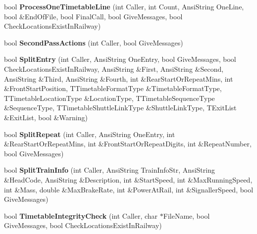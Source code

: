 \begin{DoxyCompactItemize}
\item 
\mbox{\label{class_t_train_controller_a5c51eb1e0018e189966ffdbc5d251990}} 
bool {\bfseries Process\+One\+Timetable\+Line} (int Caller, int Count, Ansi\+String One\+Line, bool \&End\+Of\+File, bool Final\+Call, bool Give\+Messages, bool Check\+Locations\+Exist\+In\+Railway)
\item 
\mbox{\label{class_t_train_controller_a193bc964187b0ae255251d2c7136540a}} 
bool {\bfseries Second\+Pass\+Actions} (int Caller, bool Give\+Messages)
\item 
\mbox{\label{class_t_train_controller_a9067975adc343b753d7eb882648c66bb}} 
bool {\bfseries Split\+Entry} (int Caller, Ansi\+String One\+Entry, bool Give\+Messages, bool Check\+Locations\+Exist\+In\+Railway, Ansi\+String \&First, Ansi\+String \&Second, Ansi\+String \&Third, Ansi\+String \&Fourth, int \&Rear\+Start\+Or\+Repeat\+Mins, int \&Front\+Start\+Position, T\+Timetable\+Format\+Type \&Timetable\+Format\+Type, T\+Timetable\+Location\+Type \&Location\+Type, T\+Timetable\+Sequence\+Type \&Sequence\+Type, T\+Timetable\+Shuttle\+Link\+Type \&Shuttle\+Link\+Type, T\+Exit\+List \&Exit\+List, bool \&Warning)
\item 
\mbox{\label{class_t_train_controller_a03d63b7579e50c092cca3b5200d9dafb}} 
bool {\bfseries Split\+Repeat} (int Caller, Ansi\+String One\+Entry, int \&Rear\+Start\+Or\+Repeat\+Mins, int \&Front\+Start\+Or\+Repeat\+Digits, int \&Repeat\+Number, bool Give\+Messages)
\item 
\mbox{\label{class_t_train_controller_afa4be4bca19620319c9e65eb0b43daa1}} 
bool {\bfseries Split\+Train\+Info} (int Caller, Ansi\+String Train\+Info\+Str, Ansi\+String \&Head\+Code, Ansi\+String \&Description, int \&Start\+Speed, int \&Max\+Running\+Speed, int \&Mass, double \&Max\+Brake\+Rate, int \&Power\+At\+Rail, int \&Signaller\+Speed, bool Give\+Messages)
\item 
\mbox{\label{class_t_train_controller_ac51af4807fe6bba453f8ab9bba42e2b5}} 
bool {\bfseries Timetable\+Integrity\+Check} (int Caller, char $\ast$File\+Name, bool Give\+Messages, bool Check\+Locations\+Exist\+In\+Railway)
\item 

\end{DoxyCompactItemize}
